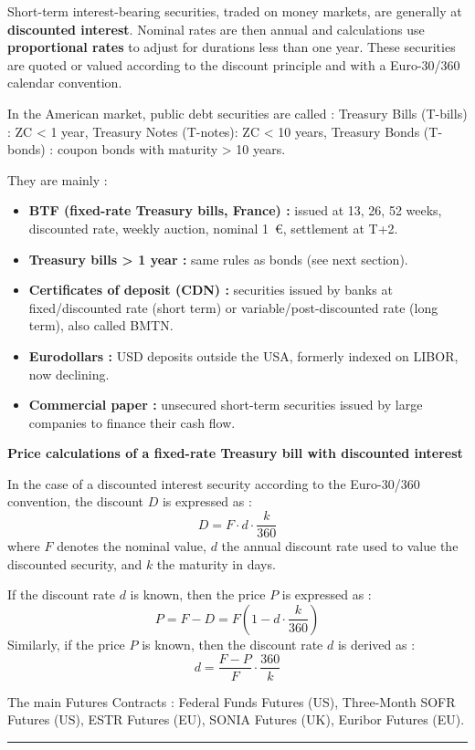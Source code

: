 \begin{f}
Short-term interest-bearing securities, traded on money markets, are generally at \textbf{discounted interest}. 
Nominal rates are then annual and calculations use \textbf{proportional rates} to adjust for durations less than one year.
These securities are quoted or valued according to the discount principle and with a Euro-30/360 calendar convention.

In the American market, public debt securities are called :
Treasury Bills (T-bills) : ZC < 1 year, Treasury Notes (T-notes): ZC < 10 years,
Treasury Bonds (T-bonds) : coupon bonds with maturity > 10 years.


They are mainly :
\begin{itemize}
	\item \textbf{BTF (fixed-rate Treasury bills, France) :} issued at 13, 26, 52 weeks, discounted rate, weekly auction, nominal 1~€, settlement at T+2.
	
	\item \textbf{Treasury bills > 1 year :} same rules as bonds (see next section).
	
	\item \textbf{Certificates of deposit (CDN) :} securities issued by banks at fixed/discounted rate (short term) or variable/post-discounted rate (long term), also called BMTN.
	
	\item \textbf{Eurodollars :} USD deposits outside the USA, formerly indexed on LIBOR, now declining.
	
	\item \textbf{Commercial paper :} unsecured short-term securities issued by large companies to finance their cash flow.
\end{itemize}

\textbf{Price calculations of a fixed-rate Treasury bill with discounted interest}

In the case of a discounted interest security according to the Euro-30/360 convention, the discount \(D\) is expressed as :
\[
D=F \cdot d \cdot \frac{k}{360}
\]
where \(F\) denotes the nominal value, \(d\) the annual discount rate used to value the discounted security, and \(k\) the maturity in days.

If the discount rate \(d\) is known, then the price \(P\) is expressed as :
\[
P=F-D=F\left(1-d \cdot \frac{k}{360}\right)
\]
Similarly, if the price \(P\) is known, then the discount rate \(d\) is derived as :
\[
d=\frac{F-P}{F} \cdot \frac{360}{k}
\]


The main Futures Contracts : Federal Funds Futures (US),
Three-Month SOFR Futures (US),
ESTR Futures (EU),
SONIA Futures (UK),
Euribor Futures (EU).

\end{f}
\hrule



